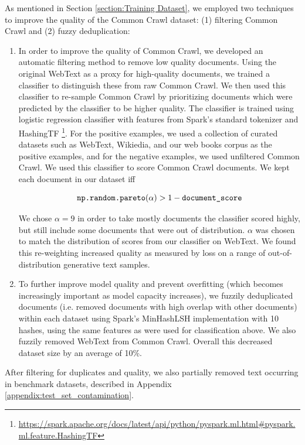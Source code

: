 As mentioned in Section \ref{section:Training Dataset}, we employed two techniques to improve the quality of the Common Crawl dataset: (1) filtering Common Crawl and (2) fuzzy deduplication:

\begin{enumerate}

\item In order to improve the quality of Common Crawl, we developed an automatic filtering method to remove low quality documents. Using the original WebText as a proxy for high-quality documents, we trained a classifier to distinguish these from raw Common Crawl. We then used this classifier to re-sample Common Crawl by prioritizing documents which were predicted by the classifier to be higher quality. The classifier is trained using logistic regression classifier with features from Spark's standard tokenizer and HashingTF \footnote{\url{https://spark.apache.org/docs/latest/api/python/pyspark.ml.html\#pyspark.ml.feature.HashingTF}}. For the positive examples, we used a collection of curated datasets such as WebText, Wikiedia, and our web books corpus as the positive examples, and for the negative examples, we used unfiltered Common Crawl.  We used this classifier to score Common Crawl documents. We kept each document in our dataset iff

\[\verb|np.random.pareto|(\alpha) > 1 - \verb|document_score|\]

We chose $\alpha = 9$ in order to take mostly documents the classifier scored highly, but still include some documents that were out of distribution. $\alpha$ was chosen to match the distribution of scores from our classifier on WebText.  We found this re-weighting increased quality as measured by loss on a range of out-of-distribution generative text samples.
\item To further improve model quality and prevent overfitting (which becomes increasingly important as model capacity increases), we fuzzily deduplicated documents (i.e. removed documents with high overlap with other documents) within each dataset using Spark's MinHashLSH implementation with 10 hashes, using the same features as were used for classification above.  We also fuzzily removed WebText from Common Crawl. Overall this decreased dataset size by an average of 10\%.

\end{enumerate}

After filtering for duplicates and quality, we also partially removed text occurring in benchmark datasets, described in Appendix \ref{appendix:test_set_contamination}.